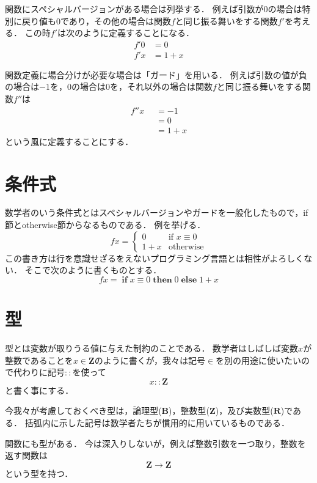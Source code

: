 \documentclass[twocolumn]{jsbook}
\newcommand{\guard}[1]{\mathop{\mid_{{#1}}}}
\newcommand{\typename}[1]{\bm{#1}}
\newcommand{\booleantype}{\typename{B}}
\newcommand{\integertype}{\typename{Z}}
\newcommand{\realtype}{\typename{R}}
\newcommand{\haskellkeyword}[1]{\textbf{#1}}
\newcommand{\otherwise}{\haskellkeyword{otherwise}}
\newcommand{\mathkeyword}[1]{\textbf{#1}}
\newcommand{\mathelse}{\mathop{\mathkeyword{else}}}
\newcommand{\mathif}{\mathop{\mathkeyword{if}}}
\newcommand{\maththen}{\mathop{\mathkeyword{then}}}
\begin{document}
関数にスペシャルバージョンがある場合は列挙する．
例えば引数が$0$の場合は特別に戻り値も0であり，その他の場合は関数$f$と同じ振る舞いをする関数$f'$を考える．
この時$f'$は次のように定義することになる．
\begin{equation*}
\begin{split}
f'0&=0\\
f'x&=1+x
\end{split}
\end{equation*}

関数定義に場合分けが必要な場合は「ガード」を用いる．
例えば引数の値が負の場合は$-1$を，$0$の場合は$0$を，それ以外の場合は関数$f$と同じ振る舞いをする関数$f''$は
\begin{equation*}
\begin{split}
f''x&\guard{x<0}=-1\\
&\guard{x\equiv0}=0\\
&\guard{\otherwise}=1+x
\end{split}
\end{equation*}
という風に定義することにする．

\section{条件式}

数学者のいう条件式とはスペシャルバージョンやガードを一般化したもので，if節とotherwise節からなるものである．
例を挙げる．
$$fx=\begin{cases}
0&\text{if $x\equiv0$}\\
1+x&\text{otherwise}
\end{cases}$$
この書き方は行を意識せざるをえないプログラミング言語とは相性がよろしくない．
そこで次のように書くものとする．
$$fx=\mathif x\equiv0\maththen0\mathelse 1+x$$

\section{型}

型とは変数が取りうる値に与えた制約のことである．
数学者はしばしば変数$x$が整数であることを$x\in\integertype$のように書くが，我々は記号$\in$を別の用途に使いたいので代わりに記号$::$を使って$$x::\integertype$$と書く事にする．

今我々が考慮しておくべき型は，論理型($\booleantype$)，整数型($\integertype$)，及び実数型($\realtype$)である．
括弧内に示した記号は数学者たちが慣用的に用いているものである．

関数にも型がある．
今は深入りしないが，例えば整数引数を一つ取り，整数を返す関数は$$\integertype\rightarrow\integertype$$という型を持つ．
\end{document}
